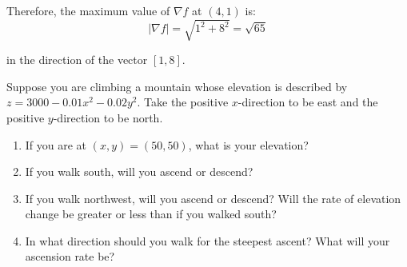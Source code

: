 Therefore, the maximum value of $\nabla f$ at $(4, 1)$ is:
$$\left| \nabla f \right| = \sqrt{1^2 + 8^2} = \sqrt{65}$$

in the direction of the vector $\left[ 1, 8 \right]$. 

\begin{Exercise}[title = {Using the Gradient to find Maximum Change}, 
label = maximum]
Suppose you are climbing a mountain whose elevation is described by $z = 3000 
- 0.01x^2 - 0.02y^2$. Take the positive $x$-direction to be east and the 
positive $y$-direction to be north. 
\begin{enumerate}
    \item If you are at $(x, y) = (50, 50)$, what is your elevation?
    \item If you walk south, will you ascend or descend?
    \item If you walk northwest, will you ascend or descend? Will the rate of 
    elevation change be greater or less than if you walked south?
    \item In what direction should you walk for the steepest ascent? What will 
    your ascension rate be?
\end{enumerate}
\vspace{50mm}
\end{Exercise}

